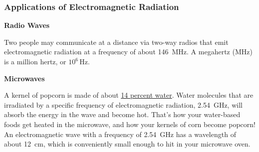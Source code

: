 \documentclass[dvipsnames]{article}
\begin{document}
\subsubsection{Applications of Electromagnetic Radiation}

\textbf{Radio Waves}

Two people may communicate at a distance via two-way radios that emit electromagnetic radiation at a frequency of about \SI{146}{MHz}. A megahertz (MHz) is a million hertz, or $10^6\,\text{Hz}$.


\begin{center}
\end{center}

\textbf{Microwaves}

A kernel of popcorn is made of about \href{https://www.scientificamerican.com/article/explore-the-pop-in-popcorn/}{14 percent water}. Water molecules that are irradiated by a specific frequency of electromagnetic radiation, \SI{2.54}{GHz}, will absorb the energy in the wave and become hot. That's how your water-based foods get heated in the microwave, and how your kernels of corn become popcorn! An electromagnetic wave with a frequency of \SI{2.54}{GHz} has a wavelength of about \SI{12}{cm}, which is conveniently small enough to hit in your microwave oven. 


\begin{center}
\end{center}
\end{document}
